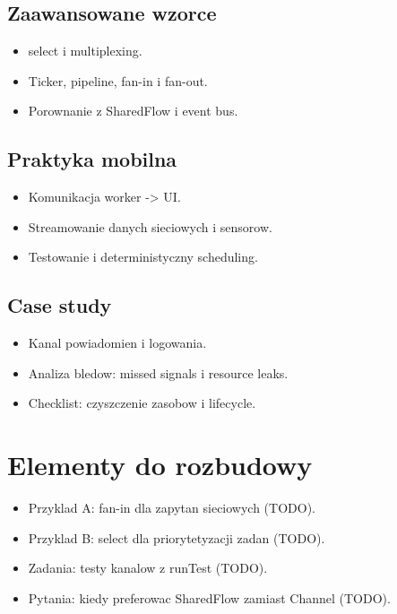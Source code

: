 \subsection{Zaawansowane wzorce}
\begin{itemize}
  \item select i multiplexing.
  \item Ticker, pipeline, fan-in i fan-out.
  \item Porownanie z SharedFlow i event bus.
\end{itemize}

\subsection{Praktyka mobilna}
\begin{itemize}
  \item Komunikacja worker -> UI.
  \item Streamowanie danych sieciowych i sensorow.
  \item Testowanie i deterministyczny scheduling.
\end{itemize}

\subsection{Case study}
\begin{itemize}
  \item Kanal powiadomien i logowania.
  \item Analiza bledow: missed signals i resource leaks.
  \item Checklist: czyszczenie zasobow i lifecycle.
\end{itemize}

\section{Elementy do rozbudowy}
\begin{itemize}
  \item Przyklad A: fan-in dla zapytan sieciowych (TODO).
  \item Przyklad B: select dla priorytetyzacji zadan (TODO).
  \item Zadania: testy kanalow z runTest (TODO).
  \item Pytania: kiedy preferowac SharedFlow zamiast Channel (TODO).
\end{itemize}

